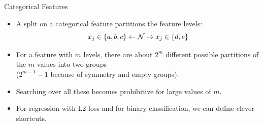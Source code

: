 \documentclass[11pt,compress,t,notes=noshow, xcolor=table]{beamer}
\begin{document}
  \begin{vbframe}{Categorical Features}
  \begin{itemize}
  \item A split on a categorical feature partitions the feature levels:
    $$x_j \in \{a,b,c\} \leftarrow \mathcal{N} \rightarrow x_j \in \{d,e\} $$
  \item For a feature with $m$ levels,
  there are about $2^m$ different possible partitions of the $m$ values into two groups\\ ($2^{m-1} - 1$ because of symmetry and empty groups).
  \item Searching over all these becomes prohibitive for large values of $m$.
  \item For regression with L2 loss and for binary classification, we can define clever shortcuts.
  \end{itemize}

  \end{vbframe}
  
\end{document}
